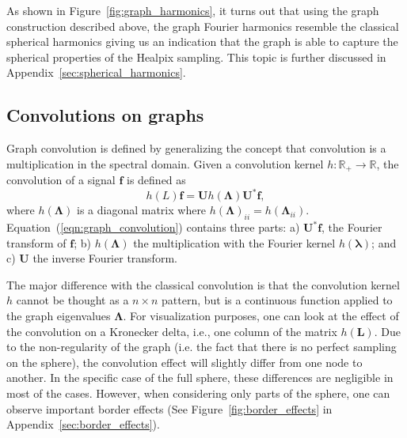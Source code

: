 \documentclass[final,twocolumn,3p,times,authoryear]{elsarticle}
\newcommand{\nati}[1]{{\color[rgb]{.1,.6,.1}{#1}}}
\newcommand{\todo}[1]{{\color[rgb]{.6,.1,.6}{#1}}}
\newcommand{\assign}[1]{{\color[rgb]{.8,.5,.8}{Assigned: #1 }}}
\newcommand{\figref}[1]{Figure~\ref{fig:#1}}
\newcommand{\eqnref}[1]{(\ref{eqn:#1})}
\renewcommand{\b}[1]{{\bm{#1}}}   %
\newcommand{\1}{\b{1}}              %
\newcommand{\0}{\b{0}}              %
\renewcommand{\L}{\b{L}} %
\newcommand{\U}{\b{U}}
\newcommand{\bLambda}{\b{\Lambda}}
\newcommand{\blambda}{\b{\lambda}}
\begin{document}
As shown in \figref{graph_harmonics}, it turns out that using the graph
construction described above, the graph Fourier harmonics resemble the
classical spherical harmonics giving us an indication that the graph is able to
capture the spherical properties of the Healpix sampling. This topic is further discussed in Appendix~\ref{sec:spherical_harmonics}.

\subsection{Convolutions on graphs}
\assign{Nathanaël, Michaël} \todo{Add a few extra references}

Graph convolution is defined by generalizing the concept that convolution is a
multiplication in the spectral domain. Given a convolution kernel
$h:\mathbb{R}_+\rightarrow\mathbb{R}$, the convolution of a signal $\b{f}$
is defined as
\begin{equation} \label{eqn:graph_convolution}
h(L)\b{f} = \U h(\bLambda) \U^* \b{f},
\end{equation}
where $h(\bLambda)$ is a diagonal matrix where $h(\bLambda)_{ii}=h(\bLambda_{ii})$.
Equation~\eqnref{graph_convolution} contains three parts: a) $\U^* \b{f}$, the
Fourier transform of $\b{f}$; b) $h(\bLambda)$ the multiplication with the Fourier
kernel $h(\blambda)$; and c) $\U$ the inverse Fourier transform.

The major difference with the classical convolution is that the convolution kernel
$h$ cannot be thought as a $n \times n$ pattern, but is a continuous function
applied to the graph eigenvalues $\bLambda$. For visualization purposes, one can
look at the effect of the convolution on a Kronecker delta, i.e., one column of the matrix
$h(\L)$.
Due to the non-regularity of the graph (i.e. the fact
that there is no perfect sampling on the sphere), the convolution effect will slightly
differ from one node to another. In the specific case of the full sphere, these
differences are negligible in most of the cases. However, when considering only parts of
the sphere, one can observe important border effects (See \figref{border_effects} in Appendix~\ref{sec:border_effects}).
\todo{can we show those?\nati{Sure I just added a figure in the Appendix.}}
\end{document}
